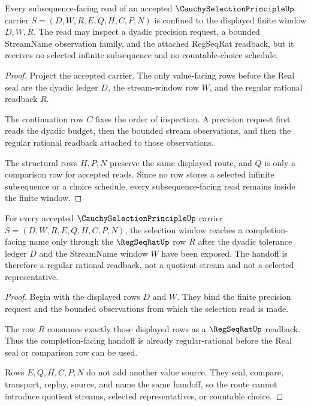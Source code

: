 \begin{theorem}
\label{thm:cauchy-selection-principle-subsequence-window}
Every subsequence-facing read of an accepted $\CauchySelectionPrincipleUp$ carrier $S=(D,W,R,E,Q,H,C,P,N)$ is confined to the displayed finite window $D,W,R$. The read may inspect a dyadic precision request, a bounded StreamName observation family, and the attached RegSeqRat readback, but it receives no selected infinite subsequence and no countable-choice schedule.
\end{theorem}
\begin{proof}
Project the accepted carrier. The only value-facing rows before the Real seal are the dyadic ledger $D$, the stream-window row $W$, and the regular rational readback $R$.

The continuation row $C$ fixes the order of inspection. A precision request first reads the dyadic budget, then the bounded stream observations, and then the regular rational readback attached to those observations.

The structural rows $H,P,N$ preserve the same displayed route, and $Q$ is only a comparison row for accepted reads. Since no row stores a selected infinite subsequence or a choice schedule, every subsequence-facing read remains inside the finite window.
\end{proof}

\begin{theorem}
\label{thm:cauchy-selection-principle-regularity-handoff}
For every accepted $\CauchySelectionPrincipleUp$ carrier $S=(D,W,R,E,Q,H,C,P,N)$, the selection window reaches a completion-facing name only through the $\RegSeqRatUp$ row $R$ after the dyadic tolerance ledger $D$ and the StreamName window $W$ have been exposed. The handoff is therefore a regular rational readback, not a quotient stream and not a selected representative.
\end{theorem}
\begin{proof}
Begin with the displayed rows $D$ and $W$. They bind the finite precision request and the bounded observations from which the selection read is made.

The row $R$ consumes exactly those displayed rows as a $\RegSeqRatUp$ readback. Thus the completion-facing handoff is already regular-rational before the Real seal or comparison row can be used.

Rows $E,Q,H,C,P,N$ do not add another value source. They seal, compare, transport, replay, source, and name the same handoff, so the route cannot introduce quotient streams, selected representatives, or countable choice.
\end{proof}

